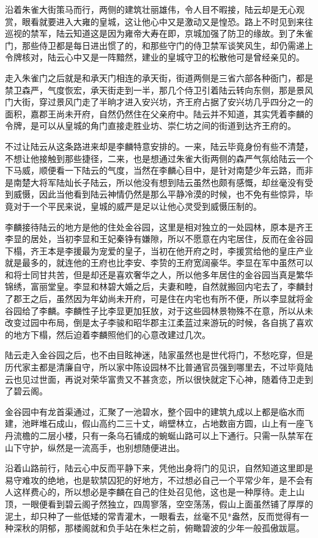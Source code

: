 沿着朱雀大街策马而行，两侧的建筑壮丽雄伟，令人目不暇接，陆云却是无心观赏，眼看就要进入大雍的皇城，这让他心中又是激动又是惶恐。路上不时见到来往巡视的禁军，陆云知道这是因为雍帝大寿在即，京城加强了防卫的缘故。到了朱雀门，那些侍卫都是每日进出惯了的，和那些守门的侍卫禁军谈笑风生，却仍需递上令牌核对，陆云心中又是一阵黯然，建业的皇城守卫的松散他可是曾经亲见的。

走入朱雀门之后就是和承天门相连的承天街，街道两侧是三省六部各种衙门，都是禁卫森严，气度恢宏，承天街走到一半，那几个侍卫引着陆云转向东侧，那是景风门大街，穿过景风门走了半晌才进入安兴坊，齐王府占据了安兴坊几乎四分之一的面积，嘉郡王尚未开府，自然仍然住在父亲府中。陆云并不知道，其实凭着李麟的令牌，是可以从皇城的角门直接走胜业坊、崇仁坊之间的街道到达齐王府的。

不过让陆云从这条路进来却是李麟特意安排的。一来，陆云毕竟身份有些不清楚，不想让他接触到那些捷径，二来，也是想通过朱雀大街两侧的森严气氛给陆云一个下马威，顺便看一下陆云的气度，当然在李麟心目中，是针对南楚少年云路，而非是南楚大将军陆灿长子陆云，所以他没有想到陆云虽然也颇有感慨，却丝毫没有受到威慑，因此当他看到陆云神情仍然是那么平静冷漠的时候，也不免有些惊异，毕竟对于一个平民来说，皇城的威严是足以让他心灵受到威慑压制的。

李麟接待陆云的地方是他的住处金谷园，这里是相对独立的一处园林，原本是齐王李显的居处，当初李显和王妃秦铮有嫌隙，所以不愿意在内宅居住，反而在金谷园下榻，齐王本是李援最为宠爱的皇子，当初在他开府之时，李援赏给他的皇庄产业就是最多的，就连他的王府也比李安、李贽的王府宽阔豪华。李显在军中虽然可以和将士同甘共苦，但是却还是喜欢奢华之人，所以他多年居住的金谷园当真是繁华锦绣，富丽堂皇。李显和林碧大婚之后，夫妻和睦，自然就搬回内宅去了，李麟封了郡王之后，虽然因为年幼尚未开府，可是住在内宅也有所不便，所以李显就将金谷园给了李麟。李麟性子比李显更加狂放，对于这些园林景物殊不在意，所以从未改变过园中布局，倒是太子李骏和昭华郡主江柔蓝过来游玩的时候，各自挑了喜欢的地方下榻，然后迫着李麟照他们的心意改建过几次。

陆云走入金谷园之后，也不由目眩神迷，陆家虽然也是世代将门，不愁吃穿，但是历代家主都是清廉自守，所以家中陈设园林不比普通官员强到哪里去，不过毕竟陆云也见过世面，再说对荣华富贵又不甚贪恋，所以很快就定下心神，随着侍卫走到了碧云阁。

金谷园中有龙首渠通过，汇聚了一池碧水，整个园中的建筑九成以上都是临水而建，池畔堆石成山，假山高约二三十丈，峭壁林立，占地数亩方圆，山上有一座飞丹流檐的二层小楼，只有一条乌石铺成的蜿蜒山路可以上下通行。只需一队禁军在山下守护，纵然是一流高手，也别想随便进出。

沿着山路前行，陆云心中反而平静下来，凭他出身将门的见识，自然知道这里即是易守难攻的绝地，也是软禁囚犯的好地方，不过想必自己一个平常少年，是不会有人这样费心的，所以想必是李麟在自己的住处召见他，这也是一种厚待。走上山顶，一眼便看到碧云阁孑然独立，四周寥落，空空荡荡，假山上面虽然铺了厚厚的泥土，却只种了一些低矮的常青灌木，一眼看去，丝毫不见*盎然，反而觉得有一种深秋的阴郁，那楼阁就和负手站在朱栏之前，俯瞰碧波的少年一般孤傲跋扈。

